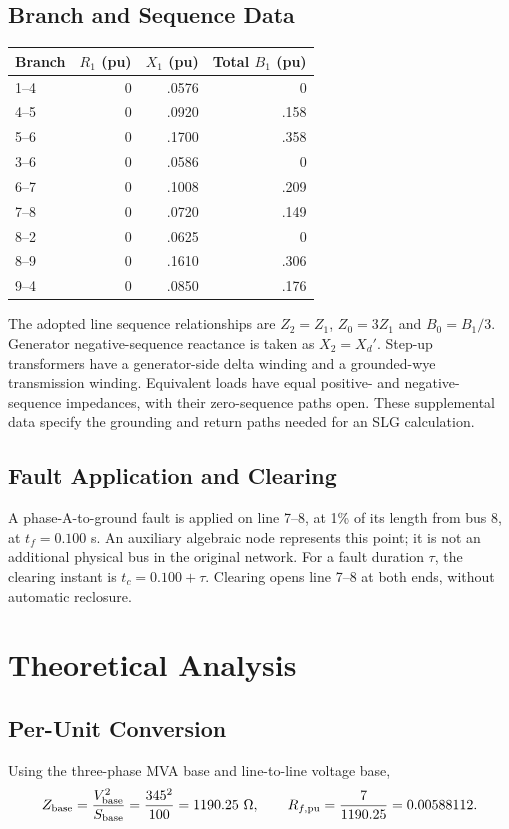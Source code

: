 \documentclass[11pt,a4paper]{article}
\begin{document}
\subsection{Branch and Sequence Data}
\begin{center}\begin{tabular}{lrrr}\toprule Branch&$R_1$ (pu)&$X_1$ (pu)&Total $B_1$ (pu)\\\midrule
1--4&0&.0576&0\\4--5&0&.0920&.158\\5--6&0&.1700&.358\\3--6&0&.0586&0\\6--7&0&.1008&.209\\7--8&0&.0720&.149\\8--2&0&.0625&0\\8--9&0&.1610&.306\\9--4&0&.0850&.176\\\bottomrule\end{tabular}\end{center}
The adopted line sequence relationships are $Z_2=Z_1$, $Z_0=3Z_1$ and $B_0=B_1/3$. Generator negative-sequence reactance is taken as $X_2=X_d'$. Step-up transformers have a generator-side delta winding and a grounded-wye transmission winding. Equivalent loads have equal positive- and negative-sequence impedances, with their zero-sequence paths open. These supplemental data specify the grounding and return paths needed for an SLG calculation.
\subsection{Fault Application and Clearing}
A phase-A-to-ground fault is applied on line 7--8, at 1\% of its length from bus 8, at $t_f=0.100$ s. An auxiliary algebraic node represents this point; it is not an additional physical bus in the original network. For a fault duration $\tau$, the clearing instant is $t_c=0.100+\tau$. Clearing opens line 7--8 at both ends, without automatic reclosure.
\section{Theoretical Analysis}
\subsection{Per-Unit Conversion}
Using the three-phase MVA base and line-to-line voltage base,
\[Z_{\rm base}=\frac{V_{\rm base}^2}{S_{\rm base}}=\frac{345^2}{100}=1190.25\ \Omega,
\qquad R_{f,\rm pu}=\frac{7}{1190.25}=0.00588112.\]
\end{document}

